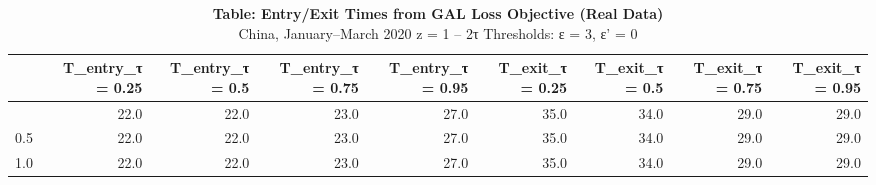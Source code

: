 \begin{table}[t]
\caption*{
{\large \textbf{Table: Entry/Exit Times from GAL Loss Objective (Real Data)}} \\ 
{\small China, January--March 2020 \textbar{} z = 1 -- 2τ \textbar{} Thresholds: ε = 3, ε' = 0}
} 
\begin{tabular*}{\linewidth}{@{\extracolsep{\fill}}l|rrrrrrrr}
\toprule
 & T\_entry\_τ = 0.25 & T\_entry\_τ = 0.5 & T\_entry\_τ = 0.75 & T\_entry\_τ = 0.95 & T\_exit\_τ = 0.25 & T\_exit\_τ = 0.5 & T\_exit\_τ = 0.75 & T\_exit\_τ = 0.95 \\ 
\midrule\addlinespace[2.5pt]
0.1 & 22.0 & 22.0 & 23.0 & 27.0 & 35.0 & 34.0 & 29.0 & 29.0 \\ 
0.5 & 22.0 & 22.0 & 23.0 & 27.0 & 35.0 & 34.0 & 29.0 & 29.0 \\ 
1.0 & 22.0 & 22.0 & 23.0 & 27.0 & 35.0 & 34.0 & 29.0 & 29.0 \\ 
\bottomrule
\end{tabular*}
\end{table}

